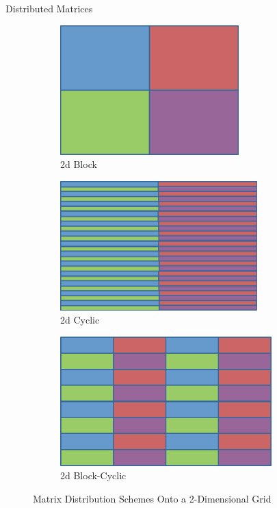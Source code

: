 \begin{frame}
\begin{block}{Distributed Matrices}
\begin{figure}[ht]
        \centering
        \begin{subfigure}[b]{0.3\textwidth}
                \centering
                
\includegraphics[height=5cm,width=\textwidth]{pics/dmat_block2d}
                \caption{2d Block}
        \end{subfigure}%
        \hspace{.1cm}
        \begin{subfigure}[b]{0.3\textwidth}
                \centering
                
\includegraphics[height=5cm,width=\textwidth]{pics/dmat_cyclic2d}
                \caption{2d Cyclic}
        \end{subfigure}
        \hspace{.01cm}
        \begin{subfigure}[b]{0.3\textwidth}
                \centering
                
\includegraphics[height=5cm,width=\textwidth]{pics/dmat_blockcyclic2d}
                \caption{2d Block-Cyclic}
        \end{subfigure}
        \caption{Matrix Distribution Schemes Onto a 2-Dimensional 
Grid}\label{fig:dmat2d}
\end{figure}
\end{block}
\end{frame}



